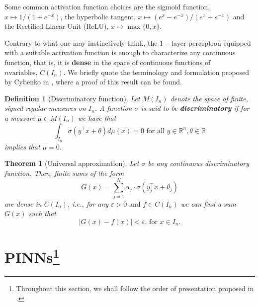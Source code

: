 \documentclass[12pt]{report} %
\newtheorem{definition}{Definition}
\newtheorem{theorem}{Theorem}
\newcommand{\tmstrong}[1]{\textbf{#1}}
\begin{document}
Some common activation function choices are the sigmoid function, $x \mapsto 1/(1 + e^{- x})$, the hyperbolic tangent, $x \mapsto (e^x - e^{- x})/(e^x + e^{- x})$ and the Rectified Linear Unit (ReLU), $x \mapsto \max \{ 0, x \}$.

Contrary to what one may instinctively think, the $1 -$layer perceptron equipped with a suitable activation function is
enough to characterize any continuous function, that is, it is
  {\tmstrong{dense}} in the space of continuous functions of $n \text{
    variables, } C (I_n)$. We briefly quote the terminology and formulation
proposed by Cybenko in \cite{cybenko1989approximation}, where a proof of this result can be found.

\begin{definition}[Discriminatory function]
  Let $M (I_n)$ denote the space of finite, signed regular measures on \(I_n\).
  A function \(\sigma\) is said to be {\tmstrong{discriminatory}} if for a
  measure \(\mu \in M (I_n)\) we have that
  \[ \int_{I_n} \sigma (y^{\top} x + \theta) d \mu (x) = 0 \text{ for all } y
    \in \mathbb{R}^n, \theta \in \mathbb{R} \]
  implies that \(\mu = 0\).
\end{definition}

\begin{theorem}[Universal approximation]
  Let \(\sigma\) be any continuous discriminatory function. Then, finite sums of
  the form
  \[ G (x) = \sum_{j = 1}^N \alpha_j \cdot \sigma (y_j^{\top} x + \theta_j) \]
  are dense in \(C (I_n)\), i.e., for any $\varepsilon > 0 \text{ and } f \in C
    (I_n)$ we can find a sum \(G (x)\) such that
  \[ | G (x) - f (x) | < \varepsilon \text{, for } x \in I_n . \]
\end{theorem}



\section[PINNs]{PINNs\footnote{Throughout this section, we shall follow the order of presentation proposed in \cite{cuomo2022scientific}.}}\label{section:pinns}
\end{document}
